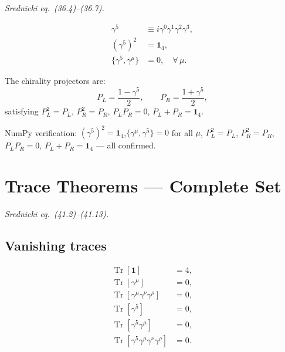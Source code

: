 \documentclass[12pt]{article}
\newcommand{\verified}[1]{\textcolor{verifygreen}{\checkmark\; #1}}
\DeclareMathOperator\Tr{Tr}
\begin{document}
\textit{Srednicki eq.\ (36.4)--(36.7).}

\begin{mdframed}[backgroundcolor=blue!5]
\begin{align}
  \gamma^5 &\equiv i\gamma^0\gamma^1\gamma^2\gamma^3,\label{eq:g5def}\\
  (\gamma^5)^2 &= \mathbf{1}_4,\label{eq:g5sq}\\
  \{\gamma^5,\gamma^\mu\} &= 0, \quad \forall\,\mu.\label{eq:g5anti}
\end{align}
\end{mdframed}

The chirality projectors are:
\begin{equation}
  P_L = \frac{1-\gamma^5}{2}, \qquad P_R = \frac{1+\gamma^5}{2},
\end{equation}
satisfying $P_L^2=P_L$, $P_R^2=P_R$, $P_LP_R=0$, $P_L+P_R=\mathbf{1}_4$.

\begin{mdframed}[backgroundcolor=green!5]
\verified{NumPy verification:}
$(\gamma^5)^2 = \mathbf{1}_4$,\quad $\{\gamma^\mu,\gamma^5\}=0$ for all $\mu$,\quad
$P_L^2=P_L$, $P_R^2=P_R$, $P_LP_R=0$, $P_L+P_R=\mathbf{1}_4$ --- all confirmed.
\end{mdframed}

\section{Trace Theorems --- Complete Set}

\textit{Srednicki eq.\ (41.2)--(41.13).}

\subsection{Vanishing traces}

\begin{mdframed}[backgroundcolor=blue!5]
\begin{align}
  \Tr[\mathbf{1}] &= 4, \label{eq:tr1}\\
  \Tr[\gamma^\mu] &= 0, \label{eq:trgmu}\\
  \Tr[\gamma^\mu\gamma^\nu\gamma^\rho] &= 0, \label{eq:tr3}\\
  \Tr[\gamma^5] &= 0, \label{eq:trg5}\\
  \Tr[\gamma^5\gamma^\mu] &= 0, \label{eq:trg5gmu}\\
  \Tr[\gamma^5\gamma^\mu\gamma^\nu\gamma^\rho] &= 0. \label{eq:trg5odd}
\end{align}
\end{mdframed}
\end{document}

